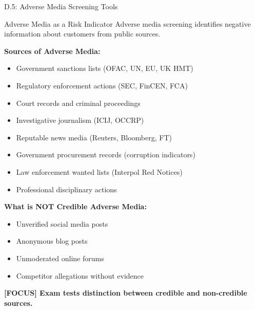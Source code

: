 \documentclass[11pt,a4paper]{beamer}
\newcommand{\examfocus}[1]{\textcolor{orange!80!black}{\textbf{[FOCUS] #1}}}
\begin{document}
\begin{frame}{D.5: Adverse Media Screening Tools}
	\begin{block}{Adverse Media as a Risk Indicator}
		Adverse media screening identifies negative information about customers from public sources.
	\end{block}
	\textbf{Sources of Adverse Media:}
	\begin{itemize}
		\item Government sanctions lists (OFAC, UN, EU, UK HMT)
		\item Regulatory enforcement actions (SEC, FinCEN, FCA)
		\item Court records and criminal proceedings
		\item Investigative journalism (ICIJ, OCCRP)
		\item Reputable news media (Reuters, Bloomberg, FT)
		\item Government procurement records (corruption indicators)
		\item Law enforcement wanted lists (Interpol Red Notices)
		\item Professional disciplinary actions
	\end{itemize}
	\textbf{What is NOT Credible Adverse Media:}
	\begin{itemize}
		\item Unverified social media posts
		\item Anonymous blog posts
		\item Unmoderated online forums
		\item Competitor allegations without evidence
	\end{itemize}
	\examfocus{Exam tests distinction between credible and non-credible sources.}
\end{frame}
\end{document}
